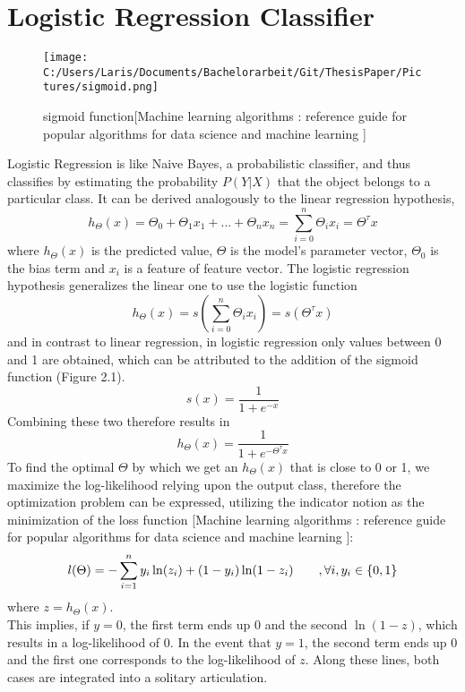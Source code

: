 \documentclass[a4paper, 11pt,titlepage,oneside,openany]{book}
\begin{document}
\section{Logistic Regression Classifier}
\begin{figure}[h]
	\centering
	\texttt{[image: C:/Users/Laris/Documents/Bachelorarbeit/Git/ThesisPaper/Pictures/sigmoid.png]}
	\caption{sigmoid function[Machine learning algorithms : reference guide for popular algorithms for data science and machine learning
		]}
	\label{fig:example}
\end{figure}
\noindent Logistic Regression is like Naive Bayes, a probabilistic classifier, and thus classifies by estimating the probability $P(Y|X)$ that the object belongs to a particular class.
It can be derived analogously to the linear regression hypothesis, 
\[
h_\Theta(x)=\Theta_0+\Theta_1x_1+...+\Theta_nx_n=\sum_{i=0}^{n}\Theta_ix_i=\Theta^\tau x
\]
where $h_\Theta(x)$ is the predicted value, $\Theta$ is the model's parameter vector, $\Theta_0$ is the bias term and $x_i$ is a feature of feature vector. The logistic regression hypothesis generalizes the linear one to use the logistic function
\[
h_\Theta(x)=s(\sum_{i=0}^{n}\Theta_ix_i)=s(\Theta^\tau x)
\]
and in contrast to linear regression, in logistic regression only values between 0 and 1 are obtained, which can be attributed to the addition of the sigmoid function (Figure 2.1). 
\[
s(x)=\frac{1}{1+e^{-x}}
\]
Combining these two therefore results in
\[
h_\Theta(x)=\frac{1}{1+e^{-\Theta^\tau x}}
\]
\noindent To find the optimal $\Theta$ by which we get an $h_\Theta(x)$ that is close to 0 or 1, we maximize the log-likelihood relying upon the output class, therefore the optimization problem can be expressed, utilizing the indicator notion as the minimization of the loss function [Machine learning algorithms : reference guide for popular algorithms for data science and machine learning
]:
\[
l(\Theta)=-\sum_{i=1}^{n}y_i\ln(z_i)+(1-y_i)\ln(1-z_i) \qquad ,\forall i,y_i \in {\{0,1\}} \\
\]
where $z=h_\Theta(x)$. \\
\noindent This implies, if $y=0$, the first term ends up $0$ and the second $\ln(1-z)$, which results in a log-likelihood of $0$. In the event that $y=1$, the second term ends up 0 and the first one corresponds to the log-likelihood of $z$. Along these lines, both cases are integrated into a solitary articulation. \\
\end{document}
